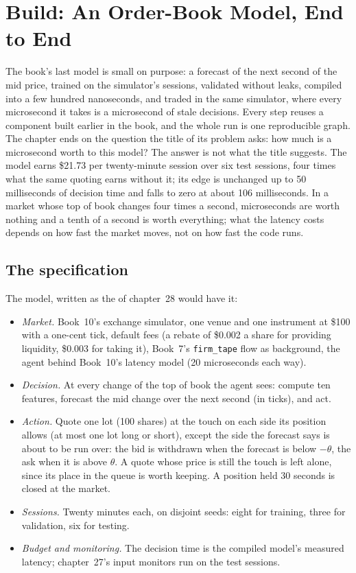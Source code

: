 \chapter{Build: An Order-Book Model, End to End}\label{ch:ml:build-an-order-book-model-end-to-end}

The book's last model is small on purpose: a forecast of the next second of the mid price, trained on the simulator's sessions,
validated without leaks, compiled into a few hundred nanoseconds, and traded in the same simulator, where every microsecond it
takes is a microsecond of stale decisions. Every step reuses a component built earlier in the book, and the whole run is one
reproducible graph. The chapter ends on the question the title of its problem asks: how much is a microsecond worth to this model?
The answer is not what the title suggests. The model earns \$21.73 per twenty-minute session over six test sessions, four times
what the same quoting earns without it; its edge is unchanged up to 50 milliseconds of decision time and falls to zero at about
106 milliseconds. In a market whose top of book changes four times a second, microseconds are worth nothing and a tenth of a
second is worth everything; what the latency costs depends on how fast the market moves, not on how fast the code runs.

\section{The specification}

The model, written as the  of chapter~28 would have it:
\begin{itemize}
\item \emph{Market.} Book~10's exchange simulator, one venue and one instrument at \$100 with a one-cent tick, default fees (a
rebate of \$0.002 a share for providing liquidity, \$0.003 for taking it), Book~7's \texttt{firm\_tape} flow as background, the
agent behind Book~10's latency model (20 microseconds each way).
\item \emph{Decision.} At every change of the top of book the agent sees: compute ten features, forecast the mid change over the
next second (in ticks), and act.
\item \emph{Action.} Quote one lot (100 shares) at the touch on each side its position allows (at most one lot long or short),
except the side the forecast says is about to be run over: the bid is withdrawn when the forecast is below $-\theta$, the ask when
it is above $\theta$. A quote whose price is still the touch is left alone, since its place in the queue is worth keeping. A
position held 30 seconds is closed at the market.
\item \emph{Sessions.} Twenty minutes each, on disjoint seeds: eight for training, three for validation, six for testing.
\item \emph{Budget and monitoring.} The decision time is the compiled model's measured latency; chapter~27's input monitors run on
the test sessions.
\end{itemize}

